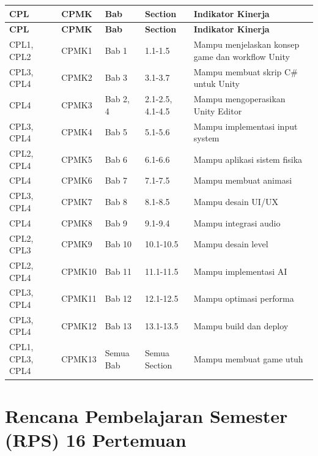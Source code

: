 \begin{longtable}{|p{1cm}|p{2cm}|p{3cm}|p{2.5cm}|p{3cm}|}
\hline
\textbf{CPL} & \textbf{CPMK} & \textbf{Bab} & \textbf{Section} & \textbf{Indikator Kinerja} \\
\hline
\endfirsthead

\hline
\textbf{CPL} & \textbf{CPMK} & \textbf{Bab} & \textbf{Section} & \textbf{Indikator Kinerja} \\
\hline
\endhead

\hline
\endfoot

\hline
\endlastfoot

CPL1, CPL2 & CPMK1 & Bab 1 & 1.1-1.5 & Mampu menjelaskan konsep game dan workflow Unity \\
CPL3, CPL4 & CPMK2 & Bab 3 & 3.1-3.7 & Mampu membuat skrip C\# untuk Unity \\
CPL4 & CPMK3 & Bab 2, 4 & 2.1-2.5, 4.1-4.5 & Mampu mengoperasikan Unity Editor \\
CPL3, CPL4 & CPMK4 & Bab 5 & 5.1-5.6 & Mampu implementasi input system \\
CPL2, CPL4 & CPMK5 & Bab 6 & 6.1-6.6 & Mampu aplikasi sistem fisika \\
CPL4 & CPMK6 & Bab 7 & 7.1-7.5 & Mampu membuat animasi \\
CPL3, CPL4 & CPMK7 & Bab 8 & 8.1-8.5 & Mampu desain UI/UX \\
CPL4 & CPMK8 & Bab 9 & 9.1-9.4 & Mampu integrasi audio \\
CPL2, CPL3 & CPMK9 & Bab 10 & 10.1-10.5 & Mampu desain level \\
CPL2, CPL4 & CPMK10 & Bab 11 & 11.1-11.5 & Mampu implementasi AI \\
CPL3, CPL4 & CPMK11 & Bab 12 & 12.1-12.5 & Mampu optimasi performa \\
CPL3, CPL4 & CPMK12 & Bab 13 & 13.1-13.5 & Mampu build dan deploy \\
CPL1, CPL3, CPL4 & CPMK13 & Semua Bab & Semua Section & Mampu membuat game utuh \\
\hline
\end{longtable}

\section{Rencana Pembelajaran Semester (RPS) 16 Pertemuan}

